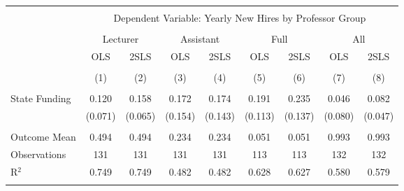 
\begin{tabular}{@{\extracolsep{5pt}}lcccccccc} 
\\[-1.8ex]\hline 
\hline \\[-1.8ex] 
 & \multicolumn{8}{c}{Dependent Variable: Yearly New Hires by Professor Group} \\ 
\cline{2-9} 
\\[-1.8ex] & \multicolumn{2}{c}{Lecturer} & \multicolumn{2}{c}{Assistant} & \multicolumn{2}{c}{Full} & \multicolumn{2}{c}{All} \\ 
 & OLS & 2SLS & OLS & 2SLS & OLS & 2SLS & OLS & 2SLS \\ 
\\[-1.8ex] & (1) & (2) & (3) & (4) & (5) & (6) & (7) & (8)\\ 
\hline \\[-1.8ex] 
 State Funding & 0.120 & 0.158 & 0.172 & 0.174 & 0.191 & 0.235 & 0.046 & 0.082 \\ 
  & (0.071) & (0.065) & (0.154) & (0.143) & (0.113) & (0.137) & (0.080) & (0.047) \\ 
 \hline \\[-1.8ex] 
Outcome Mean & 0.494 & 0.494 & 0.234 & 0.234 & 0.051 & 0.051 & 0.993 & 0.993 \\ 
Observations & 131 & 131 & 131 & 131 & 113 & 113 & 132 & 132 \\ 
R$^{2}$ & 0.749 & 0.749 & 0.482 & 0.482 & 0.628 & 0.627 & 0.580 & 0.579 \\ 
\hline 
\hline \\[-1.8ex] 
\end{tabular} 
